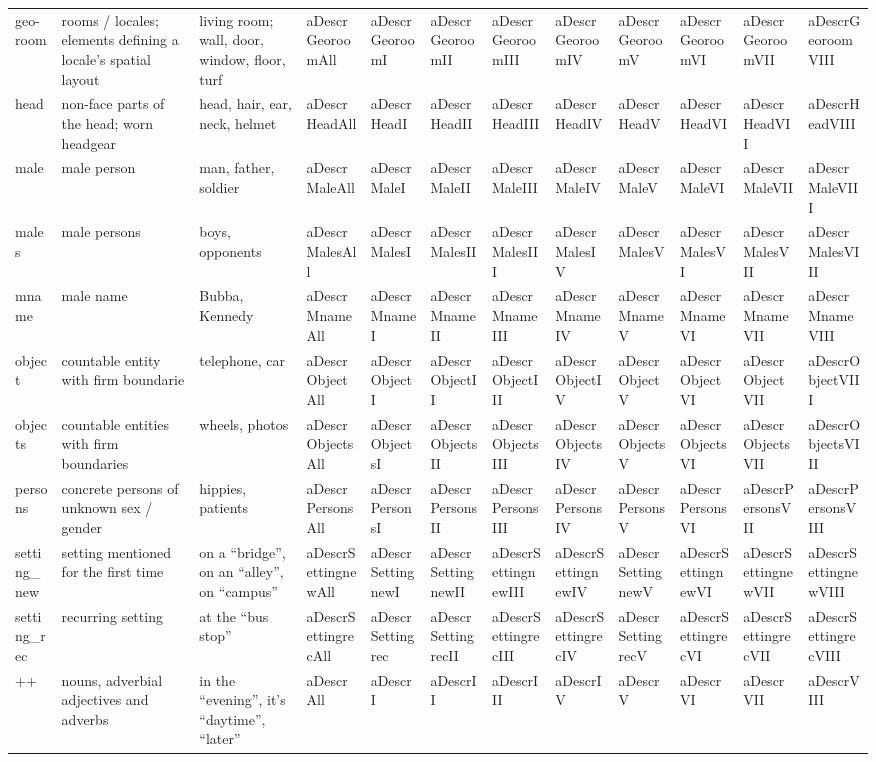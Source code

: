 \documentclass[english]{article}
\begin{document}
\begin{table}[t]
\begin{tabular}{llllllllllll}
geo-room & rooms / locales; elements defining a locale's spatial layout & living room; wall, door, window, floor, turf & aDescrGeoroomAll & aDescrGeoroomI & aDescrGeoroomII & aDescrGeoroomIII & aDescrGeoroomIV & aDescrGeoroomV & aDescrGeoroomVI & aDescrGeoroomVII & aDescrGeoroomVIII \tabularnewline
head & non-face parts of the head; worn headgear & head, hair, ear, neck, helmet & aDescrHeadAll & aDescrHeadI & aDescrHeadII & aDescrHeadIII & aDescrHeadIV & aDescrHeadV & aDescrHeadVI & aDescrHeadVII & aDescrHeadVIII \tabularnewline
male & male person & man, father, soldier & aDescrMaleAll & aDescrMaleI & aDescrMaleII & aDescrMaleIII & aDescrMaleIV & aDescrMaleV & aDescrMaleVI & aDescrMaleVII & aDescrMaleVIII \tabularnewline
males & male persons & boys, opponents & aDescrMalesAll & aDescrMalesI & aDescrMalesII & aDescrMalesIII & aDescrMalesIV & aDescrMalesV & aDescrMalesVI & aDescrMalesVII & aDescrMalesVIII \tabularnewline
mname & male name & Bubba, Kennedy & aDescrMnameAll & aDescrMnameI & aDescrMnameII & aDescrMnameIII & aDescrMnameIV & aDescrMnameV & aDescrMnameVI & aDescrMnameVII & aDescrMnameVIII \tabularnewline
object & countable entity with firm boundarie & telephone, car & aDescrObjectAll & aDescrObjectI & aDescrObjectII & aDescrObjectIII & aDescrObjectIV & aDescrObjectV & aDescrObjectVI & aDescrObjectVII & aDescrObjectVIII \tabularnewline
objects & countable entities with firm boundaries &  wheels, photos & aDescrObjectsAll & aDescrObjectsI & aDescrObjectsII & aDescrObjectsIII & aDescrObjectsIV & aDescrObjectsV & aDescrObjectsVI & aDescrObjectsVII & aDescrObjectsVIII \tabularnewline
persons & concrete persons of unknown sex / gender & hippies, patients & aDescrPersonsAll & aDescrPersonsI & aDescrPersonsII & aDescrPersonsIII & aDescrPersonsIV & aDescrPersonsV & aDescrPersonsVI & aDescrPersonsVII & aDescrPersonsVIII \tabularnewline
setting\_new & setting mentioned for the first time &  on a ``bridge'', on an ``alley'', on ``campus'' & aDescrSettingnewAll & aDescrSettingnewI & aDescrSettingnewII & aDescrSettingnewIII & aDescrSettingnewIV & aDescrSettingnewV & aDescrSettingnewVI & aDescrSettingnewVII & aDescrSettingnewVIII \tabularnewline
setting\_rec & recurring setting & at the ``bus stop'' & aDescrSettingrecAll & aDescrSettingrec & aDescrSettingrecII & aDescrSettingrecIII & aDescrSettingrecIV & aDescrSettingrecV & aDescrSettingrecVI & aDescrSettingrecVII & aDescrSettingrecVIII \tabularnewline
++ & nouns, adverbial adjectives and adverbs & in the ``evening'', it's ``daytime'', ``later'' &  aDescrAll & aDescrI & aDescrII & aDescrIII & aDescrIV & aDescrV & aDescrVI & aDescrVII & aDescrVIII \tabularnewline
\bottomrule
\end{tabular}
\end{table}
\end{document}
